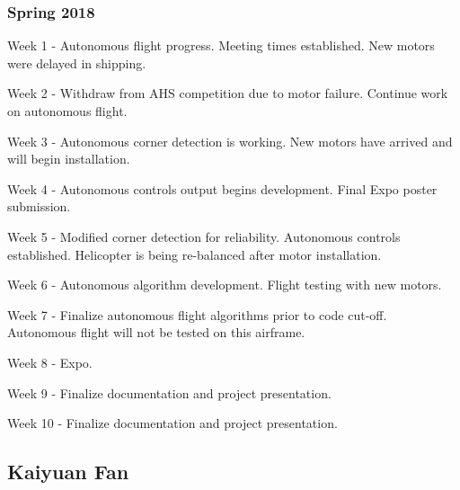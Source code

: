 \documentclass[onecolumn, draftclsnofoot,10pt, compsoc]{IEEEtran}
\begin{document}
\subsubsection{Spring 2018}
		\begin{description}
			\item{Week 1} - Autonomous flight progress. Meeting times established. New motors were delayed in shipping. 
			\item{Week 2} - Withdraw from AHS competition due to motor failure. Continue work on autonomous flight.
			\item{Week 3} - Autonomous corner detection is working. New motors have arrived and will begin installation. 
            \item{Week 4} - Autonomous controls output begins development. Final Expo poster submission. 
			\item{Week 5} - Modified corner detection for reliability. Autonomous controls established. Helicopter is being re-balanced after motor installation. 
			\item{Week 6} - Autonomous algorithm development. Flight testing with new motors. 
            \item{Week 7} - Finalize autonomous flight algorithms prior to code cut-off. Autonomous flight will not be tested on this airframe.
			\item{Week 8} - Expo.
			\item{Week 9} - Finalize documentation and project presentation. 
            \item{Week 10} - Finalize documentation and project presentation.
		\end{description}
        
        
\subsection{Kaiyuan Fan}
\end{document}
